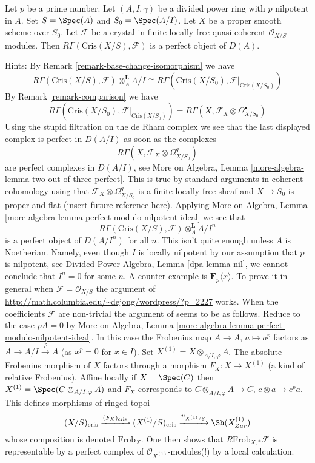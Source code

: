 \begin{remark}[Perfectness]
\label{remark-perfect}
Let $p$ be a prime number. Let $(A, I, \gamma)$ be a divided power
ring with $p$ nilpotent in $A$. Set $S = \Spec(A)$ and
$S_0 = \Spec(A/I)$. Let $X$ be a proper smooth scheme over $S_0$.
Let $\mathcal{F}$ be a crystal in finite locally free
quasi-coherent $\mathcal{O}_{X/S}$-modules.
Then $R\Gamma(\text{Cris}(X/S), \mathcal{F})$ is a
perfect object of $D(A)$.

\medskip\noindent
Hints: By Remark \ref{remark-base-change-isomorphism} we have
$$
R\Gamma(\text{Cris}(X/S), \mathcal{F}) \otimes_A^\mathbf{L} A/I
\cong
R\Gamma(\text{Cris}(X/S_0), \mathcal{F}|_{\text{Cris}(X/S_0)})
$$
By Remark \ref{remark-comparison} we have
$$
R\Gamma(\text{Cris}(X/S_0), \mathcal{F}|_{\text{Cris}(X/S_0)}) =
R\Gamma(X, \mathcal{F}_X \otimes \Omega^\bullet_{X/S_0})
$$
Using the stupid filtration on the de Rham complex we see that
the last displayed complex is perfect in $D(A/I)$ as soon as the complexes
$$
R\Gamma(X, \mathcal{F}_X \otimes \Omega^q_{X/S_0})
$$
are perfect complexes in $D(A/I)$, see
More on Algebra, Lemma \ref{more-algebra-lemma-two-out-of-three-perfect}.
This is true by standard arguments
in coherent cohomology using that $\mathcal{F}_X \otimes \Omega^q_{X/S_0}$
is a finite locally free sheaf and $X \to S_0$ is proper and flat
(insert future reference here). Applying
More on Algebra, Lemma \ref{more-algebra-lemma-perfect-modulo-nilpotent-ideal}
we see that
$$
R\Gamma(\text{Cris}(X/S), \mathcal{F}) \otimes_A^\mathbf{L} A/I^n
$$
is a perfect object of $D(A/I^n)$ for all $n$. This isn't quite enough
unless $A$ is Noetherian. Namely, even though $I$ is locally nilpotent
by our assumption that $p$ is nilpotent, see
Divided Power Algebra, Lemma \ref{dpa-lemma-nil},
we cannot conclude that $I^n = 0$ for some $n$. A counter example
is $\mathbf{F}_p\langle x \rangle$. To prove it in general when
$\mathcal{F} = \mathcal{O}_{X/S}$ the argument of
\url{http://math.columbia.edu/~dejong/wordpress/?p=2227}
works. When the coefficients $\mathcal{F}$ are non-trivial the
argument of \cite{Faltings-very} seems to be as follows. Reduce to the
case $pA = 0$ by More on Algebra, Lemma
\ref{more-algebra-lemma-perfect-modulo-nilpotent-ideal}.
In this case the Frobenius map $A \to A$, $a \mapsto a^p$ factors
as $A \to A/I \xrightarrow{\varphi} A$ (as $x^p = 0$ for $x \in I$). Set
$X^{(1)} = X \otimes_{A/I, \varphi} A$. The absolute Frobenius morphism
of $X$ factors through a morphism $F_X : X \to X^{(1)}$ (a kind of
relative Frobenius). Affine locally if $X = \Spec(C)$ then
$X^{(1)} = \Spec( C \otimes_{A/I, \varphi} A)$
and $F_X$ corresponds to $C \otimes_{A/I, \varphi} A \to C$,
$c \otimes a \mapsto c^pa$. This defines morphisms of ringed topoi
$$
(X/S)_{\text{cris}}
\xrightarrow{(F_X)_{\text{cris}}}
(X^{(1)}/S)_{\text{cris}}
\xrightarrow{u_{X^{(1)}/S}}
\Sh(X^{(1)}_{Zar})
$$
whose composition is denoted $\text{Frob}_X$. One then shows that
$R\text{Frob}_{X, *}\mathcal{F}$ is representable by a
perfect complex of $\mathcal{O}_{X^{(1)}}$-modules(!)
by a local calculation.
\end{remark}

